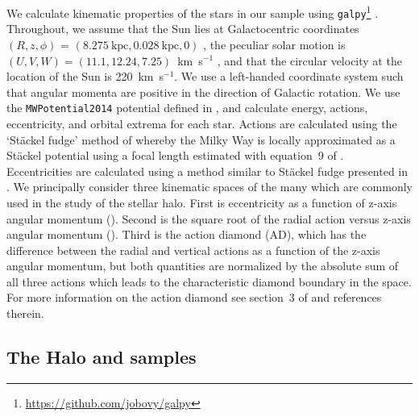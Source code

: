 We calculate kinematic properties of the stars in our sample using \texttt{galpy}\footnote{\url{https://github.com/jobovy/galpy}} \parencite{bovy15}. Throughout, we assume that the Sun lies at Galactocentric coordinates $(R,z,\phi)$ = $(8.275~\text{kpc}, 0.028~\text{kpc}, 0)$ \parencite{gravity21,bennett19}, the peculiar solar motion is $(U,V,W) = (11.1, 12.24, 7.25)$~km~s$^{-1}$ \parencite{schoenrich10}, and that the circular velocity at the location of the Sun is 220~km~s$^{-1}$. We use a left-handed coordinate system such that angular momenta are positive in the direction of Galactic rotation. We use the \texttt{MWPotential2014} potential defined in \textcite{bovy15}, and calculate energy, actions, eccentricity, and orbital extrema for each star. Actions are calculated using the `St\"{a}ckel fudge' method of \textcite{binney12} whereby the Milky Way is locally approximated as a St\"{a}ckel potential using a focal length estimated with equation~9 of \textcite{sanders12}. Eccentricities are calculated using a method similar to St\"{a}ckel fudge presented in \textcite{mackereth18c}. We principally consider three kinematic spaces of the many which are commonly used in the study of the stellar halo. First is eccentricity as a function of z-axis angular momentum (\eLz). Second is the square root of the radial action versus z-axis angular momentum (\JRLz). Third is the action diamond (AD), which has the difference between the radial and vertical actions as a function of the z-axis angular momentum, but both quantities are normalized by the absolute sum of all three actions which leads to the characteristic diamond boundary in the space. For more information on the action diamond see section~3 of \cite{lane22} and references therein.

\subsection{The Halo and \gse samples}
\label{subsec:halo-gse-samples}

